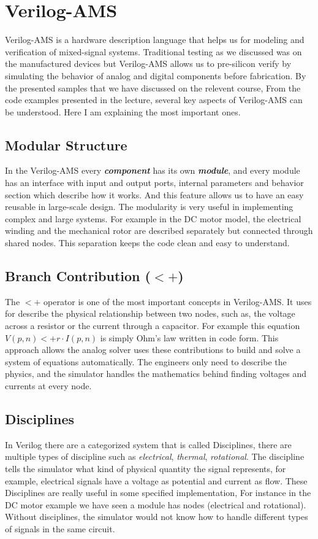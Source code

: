 \documentclass[12pt, a4paper, twocolumn]{article}
\begin{document}
\section{Verilog-AMS}
Verilog-AMS is a hardware description language that helps us for modeling and verification of mixed-signal systems.
Traditional testing as we discussed was on the manufactured devices but Verilog-AMS allows us to pre-silicon verify by simulating the behavior of analog and digital components before fabrication.
By the presented samples that we have discussed on the relevent course, From the code examples presented in the lecture, several key aspects of Verilog-AMS can be understood.
Here I am explaining the most important ones.

\subsection{Modular Structure}
In the Verilog-AMS every \textbf{\textit{component}} has its own \textbf{\textit{module}}, and every module has an interface with input and output ports, internal parameters and behavior section which describe how it works.
And this feature allows us to have an easy reusable in large-scale design.
The modularity is very useful in implementing complex and large systems.
For example in the DC motor model, the electrical winding and the mechanical rotor are 
described separately but connected through shared nodes.
This separation 
keeps the code clean and easy to understand.

\subsection{Branch Contribution (\texorpdfstring{$<+$}{<+})}
The $<+$ operator is one of the most important concepts in Verilog-AMS.
It uses for describe the physical relationship between two nodes, such as, the voltage across a resistor or the current through a capacitor.
For example this equation $V(p,n) <+ r \cdot I(p,n)$ is simply Ohm's law written in code form.
This approach allows the analog solver uses these contributions to build and solve a system of equations automatically.
The engineers only need to describe the physics, and the simulator handles the mathematics behind finding voltages and currents at every node.

\subsection{Disciplines}
In Verilog there are a categorized system that is called Disciplines, there are multiple types of discipline such as \textit{electrical}, \textit{thermal}, \textit{rotational}.
The discipline tells the simulator what kind of physical quantity the signal represents, for example, electrical signals have a voltage as potential and current as flow.
These Disciplines are really useful in some specified implementation, For instance in the DC motor example we have seen a module has nodes (electrical and rotational).
Without disciplines, the simulator would not know how to handle different 
types of signals in the same circuit.
\end{document}
